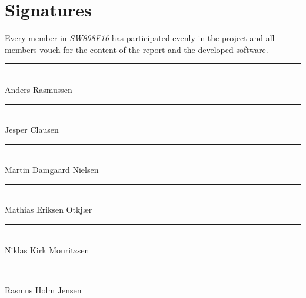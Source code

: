 
\chapter*{Signatures}
Every member in \emph{SW808F16} has participated evenly in the project and all members vouch for the content of the report and the developed software.

\vspace{1cm}

\vspace*{\fill}

\noindent
\rule{9cm}{1pt}				\\
\vspace{1.5cm}
Anders Rasmussen			\\

\noindent
\rule{9cm}{1pt}				\\
\vspace{1.5cm}
Jesper Clausen	      		\\

\noindent
\rule{9cm}{1pt}				\\
\vspace{1.5cm}
Martin Damgaard Nielsen		\\

\noindent
\rule{9cm}{1pt}				\\
\vspace{1.5cm}
Mathias Eriksen Otkjær	    \\

\noindent
\rule{9cm}{1pt}				\\
\vspace{1.5cm}
Niklas Kirk Mouritzsen		\\

\noindent
\rule{9cm}{1pt}				\\
\vspace{1.5cm}
Rasmus Holm Jensen			\\

\vspace*{\fill}